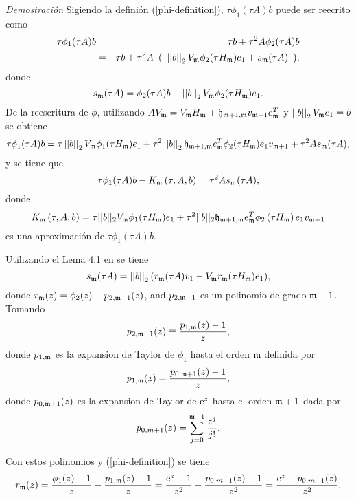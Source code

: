 \emph{Demostración}
Sigiendo la definión (\ref{phi-definition}), $\tau \phi_1(\tau A)b$ puede ser reecrito como
\begin{eqnarray*}
	\tau \phi_1(\tau A)b &=& \tau b+\tau^{2}A\phi_{2}(\tau A)b \\
	&=& \tau b+\tau^{2}A \,\ (\,\ \nnorm{\nnorm{b}}_2V_\mf\phi_{2}(\tau H_\mf)e_1 +s_\mf(\tau A) \,\ ), %
\end{eqnarray*}
donde \[ s_{\mathfrak{m}} (\tau A)= \phi_{2}(\tau A)b -\left\lvert \left\lvert b \right\rvert \right\rvert_2V_{\mathfrak{m}}\phi_{2}(\tau H_{\mathfrak{m}})e_1 .\]
De la reescritura de $\phi$, utilizando $AV_{\mathfrak{m}}=V_{\mathfrak{m}} H_{\mathfrak{m}} + \mathfrak{h}_{\mathfrak{m}+1,\mathfrak{m}}v_{\mathfrak{m}+1}e^{T}_{\mathfrak{m}}$ y  $\left\lvert \left\lvert b \right\rvert \right\rvert_2V_{\mathfrak{m}} e_1=b$ se obtiene
\begin{equation}
\tau\phi_1(\tau A)b = \tau\nnorm{\nnorm{b}}_2V_\mf\phi_1(\tau H_\mf)e_1 + \tau^{2}\nnorm{\nnorm{b}}_2\hf_{\mf+1,\mf}e^T_\mf\phi_{2}(\tau H_\mf)e_1v_{\mf+1}+\tau^{2}As_\mf (\tau A), %
\end{equation}
y se tiene que
\begin{equation}
\tau\phi_1(\tau A)b - K_{\mathfrak{m}}\left(\tau,A , b \right) = \tau^{2}As_{\mathfrak{m}}(\tau A), \label{eq:phidiffasm}
\end{equation}
donde \[{K_{\mathfrak{m}}\left(\tau,A , b \right) = \tau ||b||_2 V_{\mathfrak{m}} \phi_1(\tau H_{\mathfrak{m}})e_1}+\tau^2 ||b||_2 \mathfrak{h}_{\mathfrak{m}+1,\mathfrak{m}}e_{\mathfrak{m}}^T\phi_2\left(\tau H_{\mathfrak{m}}\right) e_1 v_{\mathfrak{m}+1} \] es una aproximación de $\tau \phi_1(\tau A)b$.

Utilizando el Lema 4.1 en \cite{Saad92} se tiene
\begin{equation}
s_{\mathfrak{m}}(\tau A)=\left\lvert \left\lvert b \right\rvert \right\rvert_2 ( r_{\mathfrak{m}}(\tau A)v_1-V_{\mathfrak{m}} r_{\mathfrak{m}}(\tau H_{\mathfrak{m}})e_1) ,\label{eq:smeq}
\end{equation}
donde $r_{\mathfrak{m}}(z) = \phi_{2}(z)-p_{2,\mathfrak{m}-1}(z)$, and $p_{2,\mathfrak{m}-1}$ es un polinomio de grado $\mathfrak{m}-1$. Tomando
\begin{equation*}
p_{2,\mathfrak{m}-1}(z)\equiv \frac{p_{1,\mathfrak{m}}(z)-1}{z},
\end{equation*}
donde $p_{1,\mathfrak{m}}$ es la expansion de Taylor de $\phi_1$ hasta el orden  $\mathfrak{m}$
definida por
\[ p_{1,\mathfrak{m}}(z)= \frac{p_{0,\mathfrak{m}+1}(z)-1}{z}, \]
donde $p_{0,\mathfrak{m}+1}(z)$  es la expansion de Taylor de $\mathrm{e}^{z}$ hasta el orden $\mathfrak{m}+1$ dada por
\[ p_{0,m+1}(z)=\sum\limits^{\mathfrak{m}+1}_{j=0}\frac{z^j}{j!}. \]

Con estos polinomios y (\ref{phi-definition}) se tiene
\begin{equation*}
r_{\mathfrak{m}}(z) = \frac{\phi_1(z)-1}{z}-\frac{p_{1,\mathfrak{m}}(z)-1}{z}=\frac{\mathrm{e}^{z}-1}{z^2}-\frac{p_{0,m+1}(z)-1}{z^2}
=\frac{\mathrm{e}^{z}-p_{0,m+1}(z)}{z^2}.
\end{equation*}

